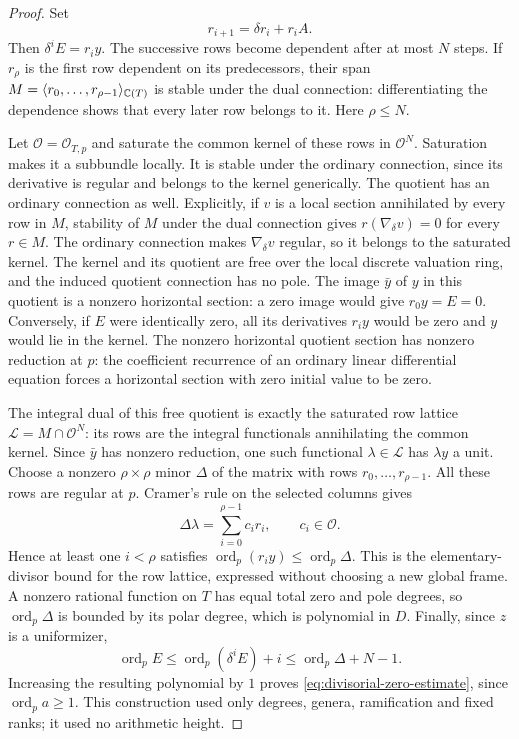 \begin{proof}
Set
\[
 r_{i+1}=\delta r_i+r_iA.
\]
Then $\delta^iE=r_iy$.  The successive rows become dependent after at
most $N$ steps.  If $r_\rho$ is the first row dependent on its
predecessors, their span
$M=\langle r_0,\ldots,r_{\rho-1}\rangle_{\mathbb C(T)}$ is stable under the
dual connection: differentiating the dependence shows that every later
row belongs to it.  Here $\rho\leq N$.

Let $\mathcal O=\mathcal O_{T,p}$ and saturate the common kernel of
these rows in $\mathcal O^N$.  Saturation makes it a subbundle locally.
It is stable under the ordinary connection, since its derivative is
regular and belongs to the kernel generically.  The quotient has an
ordinary connection as well.  Explicitly, if $v$ is a local section
annihilated by every row in $M$, stability of $M$ under the dual
connection gives $r(\nabla_\delta v)=0$ for every $r\in M$.
The ordinary connection makes $\nabla_\delta v$ regular, so it belongs
to the saturated kernel.  The kernel and its quotient are free over
the local discrete valuation ring, and the induced quotient connection
has no pole.  The image $\bar y$ of $y$ in this
quotient is a nonzero horizontal section: a zero image would give
$r_0y=E=0$.  Conversely, if $E$ were identically zero, all its
derivatives $r_i y$ would be zero and $y$ would lie in the kernel.
The nonzero horizontal quotient section has
nonzero reduction at $p$: the coefficient recurrence of an ordinary
linear differential equation forces a horizontal section with zero
initial value to be zero.

The integral dual of this free quotient is exactly the saturated row
lattice $\mathcal L=M\cap\mathcal O^N$: its rows are the integral
functionals annihilating the common kernel.  Since $\bar y$ has nonzero
reduction, one such functional $\lambda\in\mathcal L$ has
$\lambda y$ a unit.  Choose a nonzero $\rho\times\rho$ minor $\Delta$
of the matrix with rows $r_0,\ldots,r_{\rho-1}$.  All these rows are
regular at $p$.  Cramer's rule on the selected columns gives
\[
 \Delta\lambda=\sum_{i=0}^{\rho-1}c_ir_i,
 \qquad c_i\in\mathcal O.
\]
Hence at least one $i<\rho$ satisfies
$\operatorname{ord}_p(r_iy)\leq\operatorname{ord}_p\Delta$.
This is the elementary-divisor bound for the row lattice, expressed
without choosing a new global frame.  A nonzero rational function on
$T$ has equal total zero and pole degrees, so
$\operatorname{ord}_p\Delta$ is bounded by its polar degree, which is
polynomial in $D$.  Finally, since $z$ is a uniformizer,
\[
 \operatorname{ord}_p E
 \leq\operatorname{ord}_p(\delta^iE)+i
 \leq\operatorname{ord}_p\Delta+N-1.
\]
Increasing the resulting polynomial by $1$ proves
\eqref{eq:divisorial-zero-estimate}, since
$\operatorname{ord}_p a\geq1$.  This construction used only degrees,
genera, ramification and fixed ranks; it used no arithmetic height.
\end{proof}

